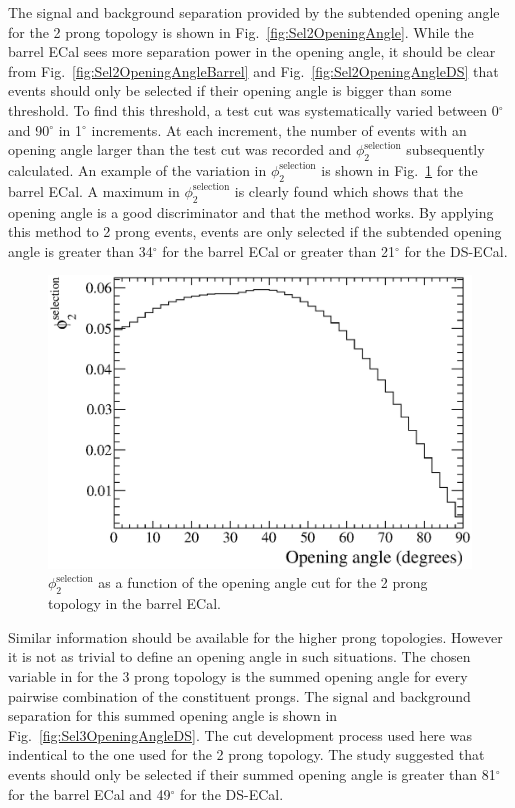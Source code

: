 The signal and background separation provided by the subtended opening angle for the 2 prong topology is shown in Fig.~\ref{fig:Sel2OpeningAngle}.  While the barrel ECal sees more separation power in the opening angle, it should be clear from Fig.~\ref{fig:Sel2OpeningAngleBarrel} and Fig.~\ref{fig:Sel2OpeningAngleDS} that events should only be selected if their opening angle is bigger than some threshold.  To find this threshold, a test cut was systematically varied between 0$^\circ$ and 90$^\circ$ in 1$^\circ$ increments.  At each increment, the number of events with an opening angle larger than the test cut was recorded and $\phi_2^{\textrm{selection}}$ subsequently calculated.  An example of the variation in $\phi_2^{\textrm{selection}}$ is shown in Fig.~\ref{fig:Sel2OpeningAngleBarrelFOM} for the barrel ECal.  A maximum in $\phi_2^{\textrm{selection}}$ is clearly found which shows that the opening angle is a good discriminator and that the method works.  By applying this method to 2 prong events, events are only selected if the subtended opening angle is greater than 34$^\circ$ for the barrel ECal or greater than 21$^\circ$ for the DS-ECal.
\begin{figure}
  \centering
  \includegraphics[width=12cm]{images/selection/mc_selection/OpeningAngle_FOM_2Prong_Barrel.eps}
  \caption{$\phi_2^{\textrm{selection}}$ as a function of the opening angle cut for the 2 prong topology in the barrel ECal.}
  \label{fig:Sel2OpeningAngleBarrelFOM}
\end{figure}
Similar information should be available for the higher prong topologies.  However it is not as trivial to define an opening angle in such situations.  The chosen variable in for the 3 prong topology is the summed opening angle for every pairwise combination of the constituent prongs.  The signal and background separation for this summed opening angle is shown in Fig.~\ref{fig:Sel3OpeningAngleDS}.  The cut development process used here was indentical to the one used for the 2 prong topology.  The study suggested that events should only be selected if their summed opening angle is greater than 81$^\circ$ for the barrel ECal and 49$^\circ$ for the DS-ECal. 
